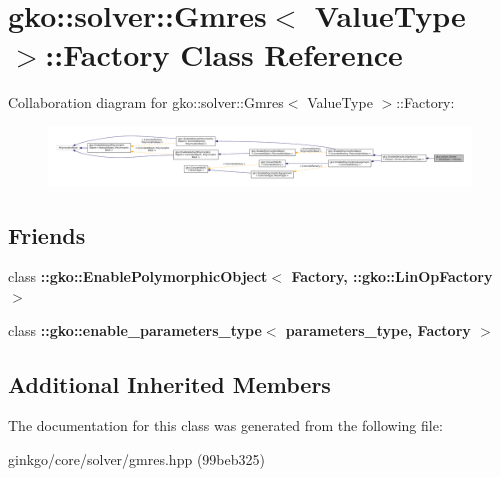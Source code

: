 \hypertarget{classgko_1_1solver_1_1Gmres_1_1Factory}{}\section{gko\+:\+:solver\+:\+:Gmres$<$ Value\+Type $>$\+:\+:Factory Class Reference}
\label{classgko_1_1solver_1_1Gmres_1_1Factory}


Collaboration diagram for gko\+:\+:solver\+:\+:Gmres$<$ Value\+Type $>$\+:\+:Factory\+:
\nopagebreak
\begin{figure}[H]
\begin{center}
\leavevmode
\includegraphics[width=350pt]{classgko_1_1solver_1_1Gmres_1_1Factory__coll__graph}
\end{center}
\end{figure}
\subsection*{Friends}
\begin{DoxyCompactItemize}
\item 
\mbox{\label{classgko_1_1solver_1_1Gmres_1_1Factory_a27e9bbc94a1c1c59f40833153eda8f78}} 
class {\bfseries \+::gko\+::\+Enable\+Polymorphic\+Object$<$ Factory, \+::gko\+::\+Lin\+Op\+Factory $>$}
\item 
\mbox{\label{classgko_1_1solver_1_1Gmres_1_1Factory_a0d176cbd42d6214e11aee8c30ca256fc}} 
class {\bfseries \+::gko\+::enable\+\_\+parameters\+\_\+type$<$ parameters\+\_\+type, Factory $>$}
\end{DoxyCompactItemize}
\subsection*{Additional Inherited Members}


The documentation for this class was generated from the following file\+:\begin{DoxyCompactItemize}
\item 
ginkgo/core/solver/gmres.\+hpp (99beb325)\end{DoxyCompactItemize}
